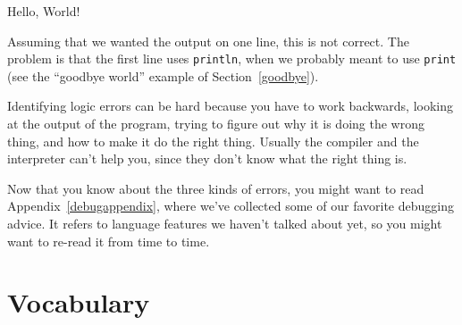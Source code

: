 \documentclass[12pt]{book}
\theoremstyle{exercise}
\newcommand{\java}[1]{\verb"#1"}
\begin{document}
\begin{stdout}
Hello,
World!
\end{stdout}

Assuming that we wanted the output on one line, this is not correct.
The problem is that the first line uses \java{println}, when we probably meant to use \java{print} (see the ``goodbye world'' example of Section~\ref{goodbye}).

Identifying logic errors can be hard because you have to work backwards, looking at the output of the program, trying to figure out why it is doing the wrong thing, and how to make it do the right thing.
Usually the compiler and the interpreter can't help you, since they don't know what the right thing is.

Now that you know about the three kinds of errors, you might want to read Appendix~\ref{debugappendix}, where we've collected some of our favorite debugging advice.
It refers to language features we haven't talked about yet, so you might want to re-read it from time to time.


\section{Vocabulary}
\end{document}

